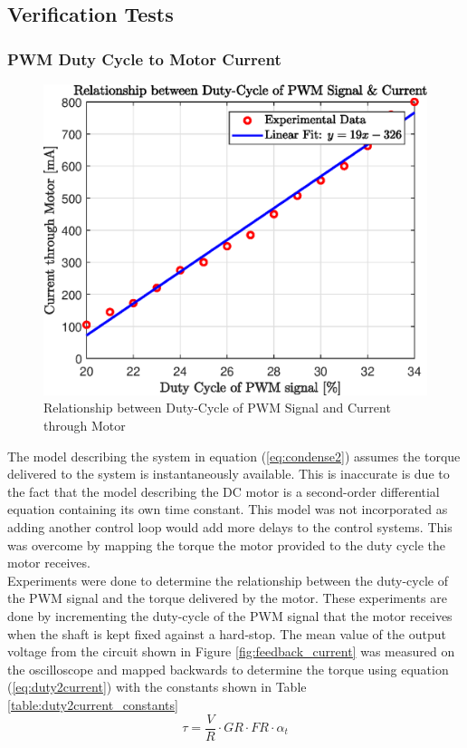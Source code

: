 \subsection{Verification Tests}

\subsubsection{ PWM Duty Cycle to Motor Current}

\begin{figure}[h]
	\centering
	\includegraphics[scale=1]{./figs/dutycycle_vs_current.eps}
	\caption{Relationship between Duty-Cycle of PWM Signal and Current through Motor}
	\label{fig:dutycycle_vs_current}
\end{figure}

The model describing the system in equation (\ref{eq:condense2}) assumes the torque delivered to the system is instantaneously available. This is inaccurate is due to the fact that the model describing the DC motor is a second-order differential equation containing its own time constant. This model was not incorporated as adding another control loop would add more delays to the control systems. This was overcome by mapping the torque the motor provided to the duty cycle the motor receives.\\

Experiments were done to determine the relationship between the duty-cycle of the PWM signal and the torque delivered by the motor. These experiments are done by incrementing the duty-cycle of the PWM signal that the motor receives when the shaft is kept fixed against a hard-stop. The mean value of the output voltage from the circuit shown in Figure \ref{fig:feedback_current} was measured on the oscilloscope and mapped backwards to determine the torque using equation (\ref{eq:duty2current}) with the constants shown in Table \ref{table:duty2current_constants}
\begin{equation} \label{eq:duty2current}
\tau = \frac{V}{R}\cdot GR \cdot FR \cdot \alpha_{t}
\end{equation}

